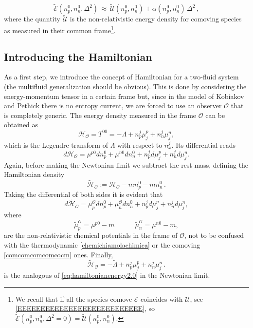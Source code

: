 \documentclass[usenatbib]{mnras}
\newcommand{\spc}{\quad \quad \quad}
\begin{document}
%
\begin{equation}
\label{yogi}
\tilde{\mathcal{E}} (n_p^0,n_n^0,\Delta^2) 
\, \approx \, \tilde{\mathcal{U}}(n_p^0,n_n^0) + \alpha(n_p^0,n_n^0) \, \Delta^2 \, ,
\end{equation}  
%
where the quantity $\tilde{\mathcal{U}}$ is the non-relativistic energy density for comoving species as measured in their common frame\footnote{ We recall that if all the species comove $\mathcal{E}$ coincides with $\mathcal{U}$, see \eqref{EEEEEEEEEEEEEEEEEEEEEEEEEEE}, so $\tilde{\mathcal{E}} (n_p^0,n_n^0,\Delta^2=0) = \tilde{\mathcal{U}}(n_p^0,n_n^0)$.}.

\subsection{Introducing the Hamiltonian}

As a first step, we introduce the concept of Hamiltonian for a two-fluid system (the multifluid generalization should be obvious). This is done by considering the energy-momentum tensor in a certain frame but, since in the model of Kobiakov and Pethick there is no entropy current, we are forced to use an  observer   $\mathcal{O}$ that is completely generic. The energy density measured in the frame  $\mathcal{O}$ can be obtained as
%
\begin{equation}\label{eq:hamiltonianenergy2.0}
\mathcal{H}_\mathcal{O} = T^{00} = -\Lambda + n_p^j \mu^p_j + n_n^j \mu^n_j ,
\end{equation} 
%
which  is the Legendre transform of $\Lambda$ with respect to $n_x^j$. Its differential reads 
%
\begin{equation}
d\mathcal{H}_\mathcal{O} = \mu^{p0} dn_p^0 + \mu^{n0} dn_n^0 + n_p^j d\mu^p_j + n_n^j d\mu^n_j .
\end{equation}
%
Again, before making the Newtonian limit we subtract the rest mass, defining the Hamiltonian density 
%
\begin{equation}
\label{rinormalizzomorbido}
\tilde{\mathcal{H}}_\mathcal{O} := \mathcal{H}_\mathcal{O} - m n_p^0 - m n_n^0 \, .
\end{equation}
%
Taking the differential of both sides it is evident that
%
\begin{equation}
\label{firstlawgenericrenormalised}
d\tilde{\mathcal{H}}_\mathcal{O} 
= 
\mu^{\mathcal{O}}_p dn_p^0 + \mu^{\mathcal{O}}_n dn_n^0 + n_p^j d\mu^p_j + n_n^j d\mu^n_j,
\end{equation}
%
where
%
\begin{equation}
\label{ubuntu}
\tilde{\mu}_{p}^\mathcal{O} = \mu^{p0} - m  \spc  \tilde{\mu}_{n}^\mathcal{O} = \mu^{n0}- m,  
\end{equation}
%
are the non-relativistic chemical potentials in the frame of $\mathcal{O}$, not to be confused with the thermodynamic \eqref{chemichiamolachimica} or the comoving \eqref{comcomcomcomcocm} ones. Finally,
%
\begin{equation}
\label{eq:hamiltonianenergyrenormalised}
\tilde{\mathcal{H}}_\mathcal{O}= -\tilde{\Lambda} + n_p^j \mu_{j}^p + n_n^j \mu_{j}^n \, .
\end{equation}
%
is the analogous of \eqref{eq:hamiltonianenergy2.0} in the Newtonian limit.
\end{document}
